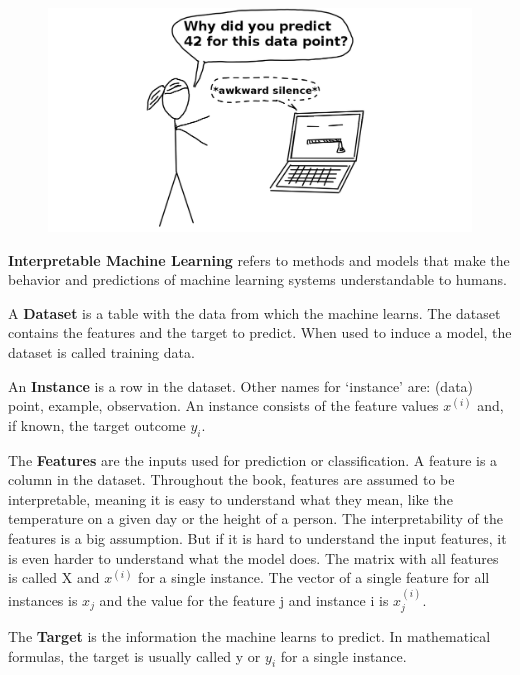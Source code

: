 \documentclass[
  12pt,
]{krantz}
\begin{document}
\begin{figure}

{\centering \includegraphics[width=\textwidth]{images/iml} 

}

\end{figure}

\textbf{Interpretable Machine Learning} refers to methods and models that make the behavior and predictions of machine learning systems understandable to humans.

A \textbf{Dataset} is a table with the data from which the machine learns.
The dataset contains the features and the target to predict.
When used to induce a model, the dataset is called training data.

An \textbf{Instance} is a row in the dataset.
Other names for `instance' are: (data) point, example, observation.
An instance consists of the feature values \(x^{(i)}\) and, if known, the target outcome \(y_i\).

The \textbf{Features} are the inputs used for prediction or classification.
A feature is a column in the dataset.
Throughout the book, features are assumed to be interpretable, meaning it is easy to understand what they mean, like the temperature on a given day or the height of a person.
The interpretability of the features is a big assumption.
But if it is hard to understand the input features, it is even harder to understand what the model does.
The matrix with all features is called X and \(x^{(i)}\) for a single instance.
The vector of a single feature for all instances is \(x_j\) and the value for the feature j and instance i is \(x^{(i)}_j\).

The \textbf{Target} is the information the machine learns to predict.
In mathematical formulas, the target is usually called y or \(y_i\) for a single instance.
\end{document}
